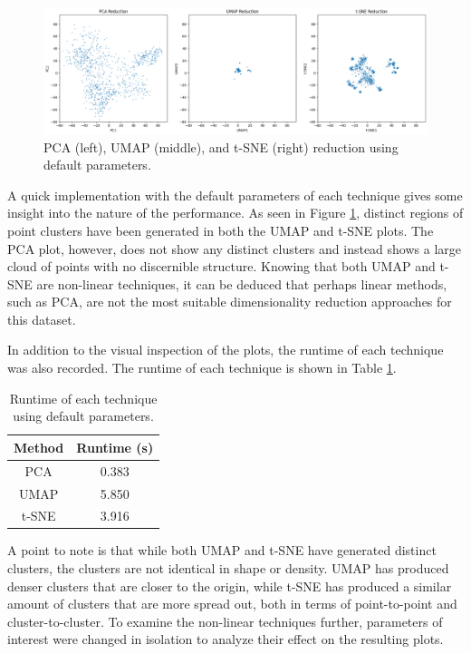 \documentclass[12pt]{article}
\begin{document}
\begin{figure}[H]
    \centering
    \includegraphics[width=\textwidth]{Images/default_dimred.png}
    \caption{PCA (left), UMAP (middle), and t-SNE (right) reduction using default parameters.}
    \label{fig:default_dimred}
\end{figure}

\vspace{-0.5cm}

A quick implementation with the default parameters of each technique gives some insight into the nature of the performance. As seen in Figure \ref{fig:default_dimred}, distinct regions of point clusters have been generated in both the UMAP and t-SNE plots. The PCA plot, however, does not show any distinct clusters and instead shows a large cloud of points with no discernible structure. Knowing that both UMAP and t-SNE are non-linear techniques, it can be deduced that perhaps linear methods, such as PCA, are not the most suitable dimensionality reduction approaches for this dataset.

In addition to the visual inspection of the plots, the runtime of each technique was also recorded. The runtime of each technique is shown in Table \ref{tab:default_dimred}.

\begin{table}[H]
    \centering
    \begin{tabular}{|c|c|}
        \hline
        \textbf{Method} & \textbf{Runtime (s)} \\
        \hline
        PCA & 0.383  \\
        \hline
        UMAP & 5.850 \\
        \hline
        t-SNE & 3.916 \\
        \hline
    \end{tabular}
    \caption{Runtime of each technique using default parameters.}
    \label{tab:default_dimred}
\end{table}

\vspace{-0.5cm}

A point to note is that while both UMAP and t-SNE have generated distinct clusters, the clusters are not identical in shape or density. UMAP has produced denser clusters that are closer to the origin, while t-SNE has produced a similar amount of clusters that are more spread out, both in terms of point-to-point and cluster-to-cluster. To examine the non-linear techniques further, parameters of interest were changed in isolation to analyze their effect on the resulting plots. 
\end{document}

